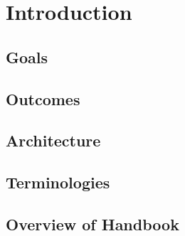 \documentclass[../alan-handbook.tex]{subfiles}
\begin{document}
\section{Introduction} \label{Introduction}

\subsection{Goals} \label{Goals}

\subsection{Outcomes} \label{Outcomes}

\subsection{Architecture} \label{Architecture}

\subsection{Terminologies} \label{Terminologies}

\subsection{Overview of Handbook} \label{Overview}
\end{document}
